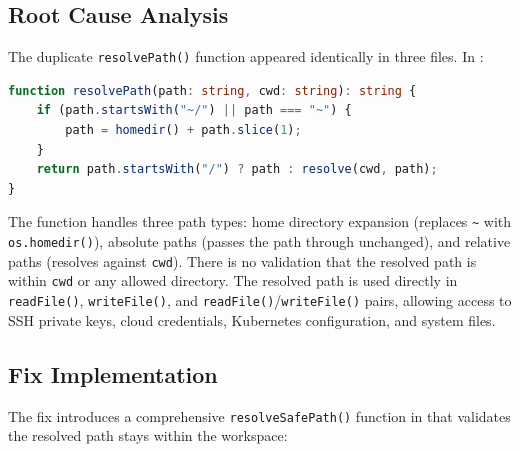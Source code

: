 \subsection*{Root Cause Analysis}
The duplicate \texttt{resolvePath()} function appeared identically in three files. In :

\begin{lstlisting}[language=TypeScript]
function resolvePath(path: string, cwd: string): string {
    if (path.startsWith("~/") || path === "~") {
        path = homedir() + path.slice(1);
    }
    return path.startsWith("/") ? path : resolve(cwd, path);
}
\end{lstlisting}

The function handles three path types: home directory expansion (replaces \texttt{\textasciitilde} with \texttt{os.homedir()}), absolute paths (passes the path through unchanged), and relative paths (resolves against \texttt{cwd}). There is no validation that the resolved path is within \texttt{cwd} or any allowed directory. The resolved path is used directly in \texttt{readFile()}, \texttt{writeFile()}, and \texttt{readFile()}/\texttt{writeFile()} pairs, allowing access to SSH private keys, cloud credentials, Kubernetes configuration, and system files.

\subsection*{Fix Implementation}
The fix introduces a comprehensive \texttt{resolveSafePath()} function in  that validates the resolved path stays within the workspace:


